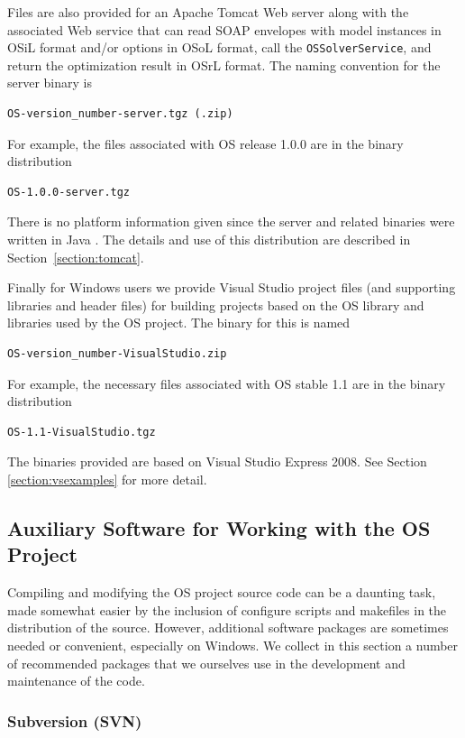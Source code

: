\documentclass[11pt]{article}
\renewcommand{\_}{{\char"5F}}
\renewcommand{\{}{{\char"7B}}
\renewcommand{\}}{{\char"7D}}
\renewcommand{\^}{{\char"0D}}
\renewcommand{\'}{{\char"0D}}
\begin{document}
Files are also provided for an Apache Tomcat  Web server along with the associated Web service 
that can 
read SOAP  envelopes with model instances in OSiL format and/or options in OSoL format, 
call the {\tt OSSolverService}, 
and return the optimization result in OSrL format.  
The naming convention for the server binary is
\begin{verbatim}
OS-version_number-server.tgz (.zip)
\end{verbatim}
For example, the files associated with  OS  release 1.0.0 are in the binary distribution
\begin{verbatim}
OS-1.0.0-server.tgz
\end{verbatim}
There is no platform information given since the server and related binaries were written in Java . 
The details and use of this distribution are described in Section~\ref{section:tomcat}.

Finally for Windows users we provide Visual Studio  project files (and supporting 
libraries and header files) for building projects based on the OS library and libraries used by the OS project. 
The binary for this is named
\begin{verbatim}
OS-version_number-VisualStudio.zip
\end{verbatim}
For example, the necessary files associated with  OS  stable 1.1 are in the binary distribution
\begin{verbatim}
OS-1.1-VisualStudio.tgz
\end{verbatim}
The binaries provided are based on Visual Studio Express 2008.  See Section \ref{section:vsexamples} for more detail.

\subsection{Auxiliary Software for Working with the OS Project} \label{section:auxiliarydownloads}

Compiling and modifying the OS project source code can be a daunting task, 
made somewhat easier by the inclusion of configure scripts and makefiles 
in the distribution of the source. However, additional software packages are 
sometimes needed or convenient, especially on Windows. 
We collect in this section a number of recommended packages that we ourselves use in the development 
and maintenance of the code.

\subsubsection{Subversion (SVN)}\label{section:svn}
\end{document}
